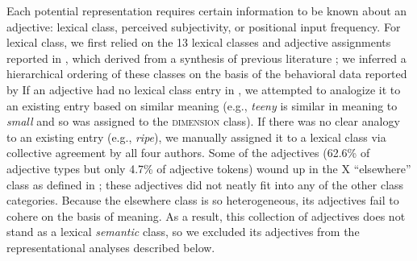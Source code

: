\documentclass[10pt]{article}
\newcommand{\gcs}[1]{\textcolor{blue}{[gcs: #1]}}
\newcommand{\gkb}[1]{\textcolor{magenta}{[gkb: #1]}}
\newcommand{\lsp}[1]{\textcolor{violet}{[lsp: #1]}}
\begin{document}
Each potential representation requires certain information to be known about an adjective: lexical class, perceived subjectivity, or positional input frequency.
For lexical class, %
we first relied on the 13 %
lexical classes and adjective assignments reported in \cite{scontras2017subjectivity}, which derived from a synthesis of previous literature \citep{dixon1982,sproat1991cross}; we inferred a hierarchical ordering of these classes on the basis of the behavioral data reported by \citeauthor{scontras2017subjectivity} 
If an adjective had no lexical class entry in \cite{scontras2017subjectivity}, we attempted to analogize it to an existing entry based on similar meaning (e.g., \textit{teeny} is similar in meaning to \textit{small} and so was assigned to the \textsc{dimension} class). 
If there was no clear analogy to an existing entry (e.g., \textit{ripe}), we manually assigned it to a lexical class via collective agreement by all four authors. %
Some of the adjectives (62.6\% of adjective types but only 4.7\% of adjective tokens) %
wound up in the X ``elsewhere'' class as defined in \citeauthor{scontras2017subjectivity}; these adjectives did not neatly fit into any of the other class categories.
Because the elsewhere class is so heterogeneous, its adjectives fail to cohere on the basis of meaning. As a result, this collection of adjectives does not stand as a lexical \emph{semantic} class, so %
we excluded its adjectives from the representational analyses described below.
\end{document}
